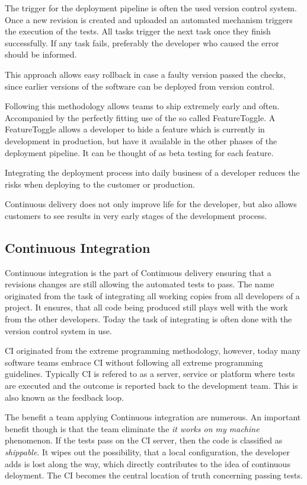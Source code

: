 The trigger for the deployment pipeline is often the used version control
system. Once a new revision is created and uploaded an automated mechanism
triggers the execution of the tests. All tasks trigger the next task once they
finish successfully. If any task fails, preferably the developer who caused the
error should be informed.

This approach allows easy rollback in case a faulty version passed the checks,
since earlier versions of the software can be deployed from version control.

Following this methodology allows teams to ship extremely early and often.
Accompanied by the perfectly fitting use of the so called FeatureToggle. A
FeatureToggle allows a developer to hide a feature which is currently in
development in production, but have it available in the other phases of the
deployment pipeline. It can be thought of as beta testing for each feature.

Integrating the deployment process into daily business of a developer reduces
the risks when deploying to the customer or production.

Continuous delivery does not only improve life for the developer, but also
allows customers to see results in very early stages of the development
process.

\subsection{Continuous Integration}

Continuous integration is the part of Continuous delivery ensuring that a
revisions changes are still allowing the automated tests to pass. The name
originated from the task of integrating all working copies from all developers
of a project. It ensures, that all code being produced still plays well with
the work from the other developers. Today the task of integrating is often done
with the version control system in use.

CI originated from the extreme programming methodology, however, today many
software teams embrace CI without following all extreme programming guidelines.
Typically CI is refered to as a server, service or platform where tests are
executed and the outcome is reported back to the development team. This is also
known as the feedback loop.

The benefit a team applying Continuous integration are numerous. An important
benefit though is that the team eliminate the \textit{it works on my machine}
phenomenon. If the tests pass on the CI server, then the code is classified as
\textit{shippable}. It wipes out the possibility, that a local configuration,
the developer adds is lost along the way, which directly contributes to the
idea of continuous deloyment. The CI becomes the central location of truth
concerning passing tests.


